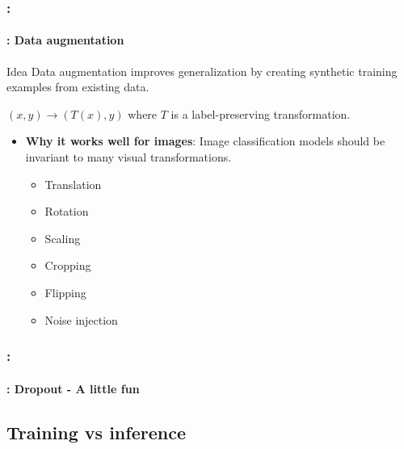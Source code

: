 \documentclass[xcolor=table]{beamer}
\begin{document}
\begin{frame}
	\frametitle{\insertshortsubtitle: \insertsection}
	\framesubtitle{\insertsubsection: Data augmentation}
	
	\begin{block}{Idea}
		Data augmentation improves generalization by creating synthetic training examples from existing data.
		
		$(x, y) \rightarrow (T(x), y)$ where $T$ is a label-preserving transformation.
	\end{block}
	
	\begin{itemize}
		\item \textbf{Why it works well for images}:
		Image classification models should be invariant to many visual transformations.
		\begin{itemize}
			\item Translation
			\item Rotation
			\item Scaling
			\item Cropping
			\item Flipping
			\item Noise injection
		\end{itemize}
	\end{itemize}
	
	
\end{frame}


\begin{frame}
	\frametitle{\insertshortsubtitle: \insertsection}
	\framesubtitle{\insertsubsection: Dropout - A little fun}
	
	
\end{frame}

\subsection{Training vs inference}
\end{document}
